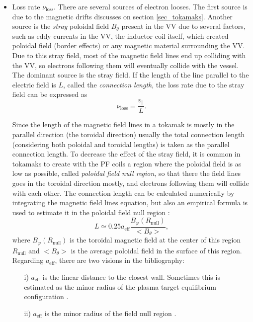 \documentclass[a4paper,12pt,oneside]{book}
\begin{document}
\begin{itemize}
	\item Loss rate $\nu_\text{loss}$. There are several sources of electron looses. The first source is due to the magnetic drifts discusses on section \ref{sec_tokamaks}. Another source is the \textit{stray} poloidal field $B_\theta$ present in the VV due to several factors, such as eddy currents in the VV, the inductor coil itself, which created poloidal field (border effects) or any magnetic material surrounding the VV. Due to this stray field, most of the magnetic field lines end up colliding with the VV, so electrons following them will eventually collide with the vessel. The dominant source is the stray field. If the length of the line parallel to the electric field is $L$, called the \textit{connection length}, the loss rate due to the stray field can be expressed as
%
	\begin{equation}\label{nu loss}
\nu_\text{loss} = \dfrac{v_{\parallel}}{L}.
	\end{equation}

Since the length of the magnetic field lines in a tokamak is mostly in the parallel direction (the toroidal direction) usually the total connection length (considering both poloidal and toroidal lengths) is taken as the parallel connection length. To decrease the effect of the stray field, it is common in tokamaks to create with the PF coils a region where the poloidal field is as low as possible, called \textit{poloidal field null region}, so that there the field lines goes in the toroidal direction mostly, and electrons following them will collide with each other. The connection length can be calculated numerically by integrating the magnetic field lines equation, but also an empirical formula is used to estimate it in the poloidal field null region \cite{ITER_2007}:
%
	\begin{equation}\label{ec L}
L \simeq 0.25 a_\text{eff}\dfrac{B_\varphi(R_{\text{null}})}{<B_\theta>},
	\end{equation}
where $B_\varphi(R_{\text{null}})$ is the toroidal magnetic field at the center of this region $R_{\text{null}}$ and $<B_\theta>$ is the average poloidal field in the surface of this region. Regarding $a_\text{eff}$, there are two visions in the bibliography:
%
	\begin{itemize}
		\item[i)] $a_\text{eff}$ is the linear distance to the closest wall. Sometimes this is estimated as the minor radius of the plasma target equilibrium configuration \cite{KimThesis, Lloyd_1991}.
		\item[ii)] $a_\text{eff}$ is the minor radius of the field null region \cite{TCV_thesis, ITER_2007, ITER_2019}.
	\end{itemize}

\end{itemize}
\end{document}
